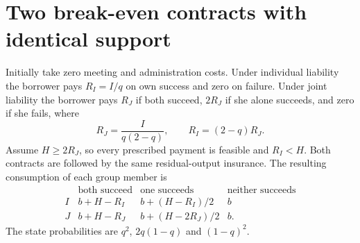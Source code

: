 \documentclass[11pt]{article}
\theoremstyle{remark}
\begin{document}
\section{Two break-even contracts with identical support}
Initially take zero meeting and administration costs. Under individual
liability the borrower pays $R_I=I/q$ on own success and zero on failure.
Under joint liability the borrower pays $R_J$ if both succeed, $2R_J$
if she alone succeeds, and zero if she fails, where
\[
 R_J=\frac{I}{q(2-q)},\qquad R_I=(2-q)R_J. \tag{1}
\]
Assume $H\geq2R_J$, so every prescribed payment is feasible and
$R_I<H$. Both contracts are followed by the same residual-output insurance.
The resulting consumption of each group member is
\[
\begin{array}{c|ccc}
 &\text{both succeed}&\text{one succeeds}&\text{neither succeeds}\\ \hline
 I&b+H-R_I&b+(H-R_I)/2&b\\
 J&b+H-R_J&b+(H-2R_J)/2&b.
\end{array} \tag{2}
\]
The state probabilities are $q^2$, $2q(1-q)$ and $(1-q)^2$.
\end{document}
